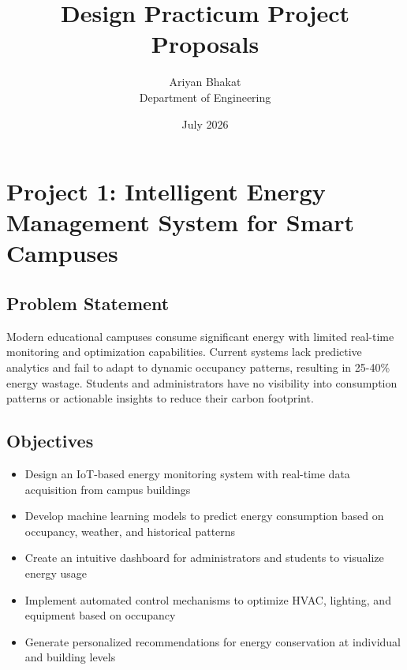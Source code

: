 \documentclass[12pt,a4paper]{article}
\title{\textbf{Design Practicum Project Proposals}}
\author{Ariyan Bhakat\\Department of Engineering}
\date{July 2026}
\begin{document}
\maketitle

\tableofcontents
\newpage

\section{Project 1: Intelligent Energy Management System for Smart Campuses}

\subsection{Problem Statement}
Modern educational campuses consume significant energy with limited real-time monitoring and optimization capabilities. Current systems lack predictive analytics and fail to adapt to dynamic occupancy patterns, resulting in 25-40\% energy wastage. Students and administrators have no visibility into consumption patterns or actionable insights to reduce their carbon footprint.

\subsection{Objectives}
\begin{itemize}[leftmargin=*]
    \item Design an IoT-based energy monitoring system with real-time data acquisition from campus buildings
    \item Develop machine learning models to predict energy consumption based on occupancy, weather, and historical patterns
    \item Create an intuitive dashboard for administrators and students to visualize energy usage
    \item Implement automated control mechanisms to optimize HVAC, lighting, and equipment based on occupancy
    \item Generate personalized recommendations for energy conservation at individual and building levels
\end{itemize}
\end{document}
